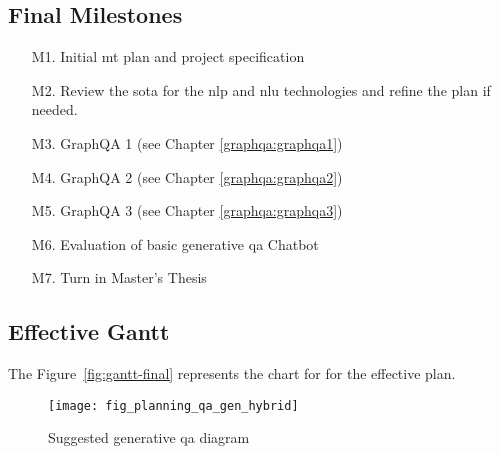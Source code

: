 \subsection{Final Milestones}
\begin{itemize}
    \setlength\itemsep{0em}
    \item[M1.] Initial \gls{mt} plan and project specification
    \item[M2.] Review the \gls{sota} for the \gls{nlp} and \gls{nlu} technologies and refine the plan if needed.
    \item[M3.] GraphQA 1 (see Chapter \ref{graphqa:graphqa1})
    \item[M4.] GraphQA 2 (see Chapter \ref{graphqa:graphqa2})
    \item[M5.] GraphQA 3 (see Chapter \ref{graphqa:graphqa3})
    \item[M6.] Evaluation of basic generative \gls{qa} Chatbot
    \item[M7.] Turn in Master's Thesis
\end{itemize}

\subsection{Effective Gantt}
The Figure~\ref{fig:gantt-final} represents the chart for for the effective plan.

\begin{figure}
    \centering
    \texttt{[image: fig\_planning\_qa\_gen\_hybrid]}
    \caption{Suggested \gls{generative} \gls{qa} diagram}
    \label{fig:fig_planning_qa_gen_hybrid}
\end{figure}





